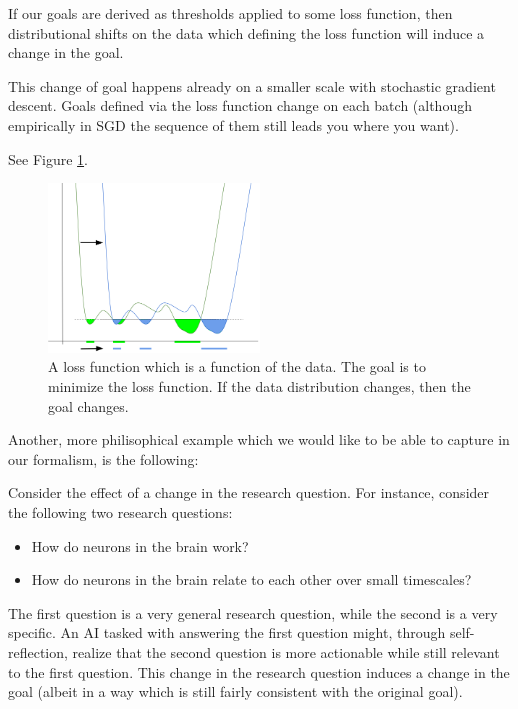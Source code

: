 \documentclass{article}
\begin{document}
\begin{example}
If our goals are derived as thresholds applied to some loss function, then distributional shifts on the data which defining the loss function will induce a change in the goal.

This change of goal happens already on a smaller scale with stochastic gradient descent. Goals defined via the loss function change on each batch (although empirically in SGD the sequence of them still leads you where you want).

See Figure \ref{fig:loss-shift}.
\end{example}

\begin{figure}[ht]
    \centering
    \includegraphics[width=0.5\textwidth]{pics/loss-shift.png} 
    \caption{A loss function which is a function of the data. The goal is to minimize the loss function. If the data distribution changes, then the goal changes.}
    \label{fig:loss-shift} 
\end{figure}

Another, more philisophical example which we would like to be able to capture in our formalism, is the following:

\begin{example}
    Consider the effect of a change in the research question. For instance, consider the following two research questions: 
    \begin{itemize}
        \item How do neurons in the brain work?
        \item How do neurons in the brain relate to each other over small timescales?
    \end{itemize}
    The first question is a very general research question, while the second is a very specific. An AI tasked with answering the first question might, through self-reflection, realize that the second question is more actionable while still relevant to the first question. This change in the research question induces a change in the goal (albeit in a way which is still fairly consistent with the original goal).
\end{example}
\end{document}
